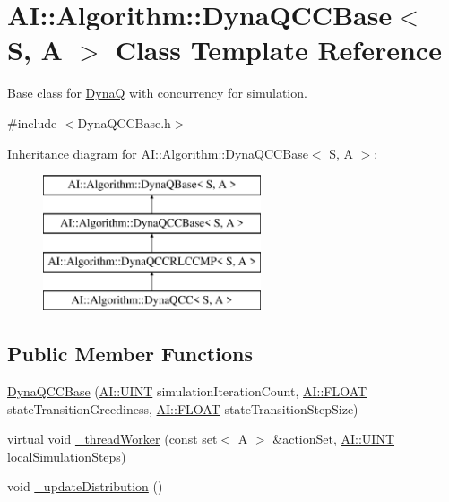 \hypertarget{classAI_1_1Algorithm_1_1DynaQCCBase}{\section{A\+I\+:\+:Algorithm\+:\+:Dyna\+Q\+C\+C\+Base$<$ S, A $>$ Class Template Reference}
\label{classAI_1_1Algorithm_1_1DynaQCCBase}
}


Base class for \hyperlink{classAI_1_1Algorithm_1_1DynaQ}{Dyna\+Q} with concurrency for simulation.  




{\ttfamily \#include $<$Dyna\+Q\+C\+C\+Base.\+h$>$}

Inheritance diagram for A\+I\+:\+:Algorithm\+:\+:Dyna\+Q\+C\+C\+Base$<$ S, A $>$\+:\begin{figure}[H]
\begin{center}
\leavevmode
\includegraphics[height=4.000000cm]{classAI_1_1Algorithm_1_1DynaQCCBase}
\end{center}
\end{figure}
\subsection*{Public Member Functions}
\begin{DoxyCompactItemize}
\item 
\hyperlink{classAI_1_1Algorithm_1_1DynaQCCBase_acd1924d5f560d9a7298e442dfa33716a}{Dyna\+Q\+C\+C\+Base} (\hyperlink{namespaceAI_ab6e14dc1e659854858a87e511f1439ec}{A\+I\+::\+U\+I\+N\+T} simulation\+Iteration\+Count, \hyperlink{namespaceAI_a41b74884a20833db653dded3918e05c3}{A\+I\+::\+F\+L\+O\+A\+T} state\+Transition\+Greediness, \hyperlink{namespaceAI_a41b74884a20833db653dded3918e05c3}{A\+I\+::\+F\+L\+O\+A\+T} state\+Transition\+Step\+Size)
\item 
virtual void \hyperlink{classAI_1_1Algorithm_1_1DynaQCCBase_a56e5d7ee46d67400f9e2411e801f93d2}{\+\_\+thread\+Worker} (const set$<$ A $>$ \&action\+Set, \hyperlink{namespaceAI_ab6e14dc1e659854858a87e511f1439ec}{A\+I\+::\+U\+I\+N\+T} local\+Simulation\+Steps)
\item 
void \hyperlink{classAI_1_1Algorithm_1_1DynaQCCBase_aeff65821d73179f84390892d8a2b0d3c}{\+\_\+update\+Distribution} ()
\end{DoxyCompactItemize}
